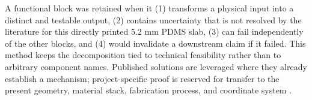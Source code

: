 \clearpage
\hypertarget{q3-functional-blocks}{}


{\fontsize{9.35}{11.05}\selectfont
A functional block was retained when it (1) transforms a physical input into a
distinct and testable output, (2) contains uncertainty that is not resolved by
the literature for this directly printed 5.2 mm PDMS slab, (3) can fail
independently of the other blocks, and (4) would invalidate a downstream claim
if it failed. This method keeps the decomposition tied to technical feasibility
rather than to arbitrary component names. Published solutions are leveraged
where they already establish a mechanism; project-specific proof is reserved
for transfer to the present geometry, material stack, fabrication process, and
coordinate system \cite{albrecht2019,liew2020,aitmammar2020,q3kwak2020}.\par}

